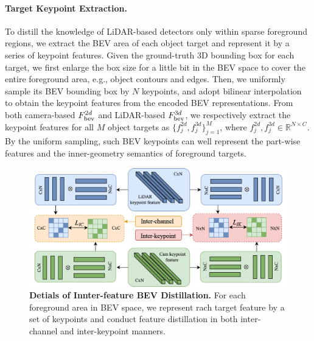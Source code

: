 \paragraph{Target Keypoint Extraction.}
To distill the knowledge of LiDAR-based detectors only within sparse foreground regions, we extract the BEV area of each object target and represent it by a series of keypoint features.
Given the ground-truth 3D bounding box for each target, we first enlarge the box size for a little bit in the BEV space to cover the entire foreground area, e.g., object contours and edges. Then, we uniformly sample its BEV bounding box by $N$ keypoints, and adopt bilinear interpolation to obtain the keypoint features from the encoded BEV representations. From both camera-based $F^{2d}_{\rm bev}$ and LiDAR-based $F^{3d}_{\rm bev}$, we respectively extract the keypoint features for all $M$ object targets as $\{f_j^{2d}, f_j^{3d}\}_{j=1}^M$, where $f_j^{2d}, f_j^{3d} \in {\mathbb{R}^{N\times C}}$. By the uniform sampling, such BEV keypoints can well represent the part-wise features and the inner-geometry semantics of foreground targets.

\begin{figure}[!t]
    \centering
    \includegraphics[scale=0.17]{cvpr_2022/iccv_fig6_2.drawio.png}
    \caption{\textbf{Detials of Innter-feature BEV Distillation.} For each foreground area in BEV space, we represent rach target feature by a set of keypoints and conduct feature distillation in both inter-channel and inter-keypoint manners.
    }
    \label{fig:structure_attn}
\end{figure}


